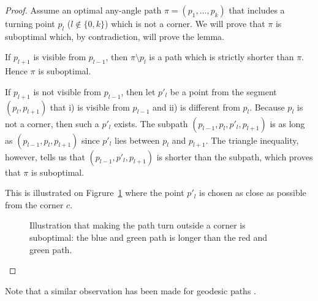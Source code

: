 \begin{proof}
{
  Assume an optimal any-angle path $\pi = (p_1,\dots,p_k)$ 
  that includes a turning point $p_l$ ($l \not\in \{0,k\}$) 
  which is not a corner.  
  We will prove that $\pi$ is suboptimal 
  which, by contradiction, will prove the lemma.  
  
  If $p_{l+1}$ is visible from $p_{l-1}$, 
  then  $\pi \setminus p_l$ is a path 
  which is strictly shorter than $\pi$.  
  Hence $\pi$ is suboptimal.  

  If $p_{l+1}$ is not visible from $p_{l-1}$, 
  then let $p'_l$ be a point from the segment $(p_l,p_{l+1})$ 
  that i) is visible from $p_{l-1}$ 
  and ii) is different from $p_l$.  
  Because $p_l$ is not a corner, 
  then such a $p'_l$ exists.  
  The subpath $(p_{l-1},p_l,p'_l,p_{l+1})$ 
  is as long as $(p_{l-1},p_l,p_{l+1})$ 
  since $p'_l$ lies between $p_l$ and $p_{l+1}$.  
  The triangle inequality, however, 
  tells us that $(p_{l-1},p'_l,p_{l+1})$ is shorter than the subpath, 
  which proves that $\pi$ is suboptimal.

  This is illustrated on Figrure~\ref{fig::corner}  
  where the point $p'_l$ is chosen 
  as close as possible from the corner $c$.  
}

\begin{figure}[ht]
  \begin{center}
    
  \end{center}
  \caption{Illustration that making the path turn 
  outside a corner is suboptimal: 
  the blue and green path is longer than the red and green path.}
  \label{fig::corner}
\end{figure}

\end{proof}

Note that a similar observation has been made for geodesic paths \cite{mitchell87}.  

